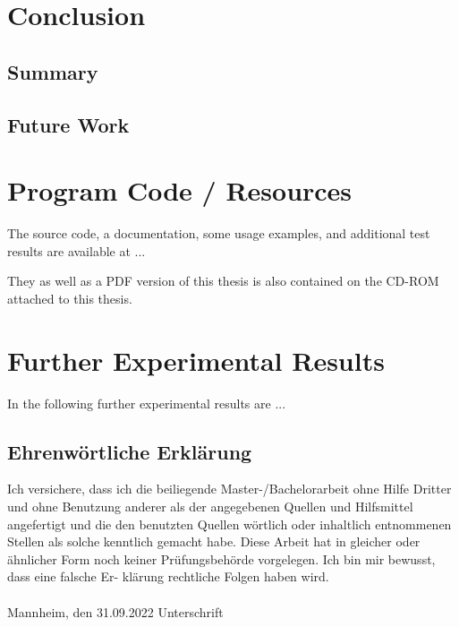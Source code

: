 \documentclass[11pt,titlepage,oneside,openany]{book}
\begin{document}
\chapter{Conclusion}
\label{cha:conclusion}


\section{Summary}
\label{sec:sum}


\section{Future Work}
\label{sec:future}






\appendix

\chapter{Program Code / Resources}
\label{cha:appendix-a}

The source code, a documentation, some usage examples, and additional test results are available at ...

They as well as a PDF version of this thesis is also contained on the CD-ROM attached to this thesis.

\chapter{Further Experimental Results}
\label{cha:appendix-b}

In the following further experimental results are ...


\newpage


\pagestyle{empty}


\section*{Ehrenw\"ortliche Erkl\"arung}
Ich versichere, dass ich die beiliegende Master-/Bachelorarbeit ohne Hilfe Dritter
und ohne Benutzung anderer als der angegebenen Quellen und Hilfsmittel
angefertigt und die den benutzten Quellen w\"ortlich oder inhaltlich
entnommenen Stellen als solche kenntlich gemacht habe. Diese Arbeit
hat in gleicher oder \"ahnlicher Form noch keiner Pr\"ufungsbeh\"orde
vorgelegen. Ich bin mir bewusst, dass eine falsche Er- kl\"arung rechtliche Folgen haben
wird.
\\
\\

\noindent
Mannheim, den 31.09.2022 \hspace{4cm} Unterschrift
\end{document}
